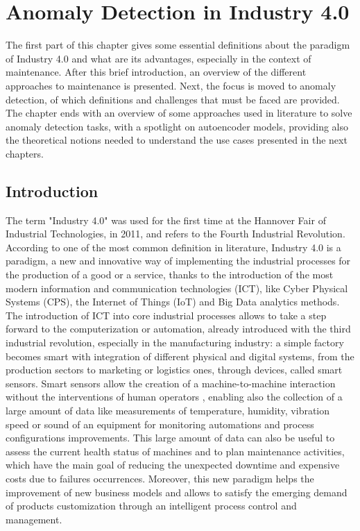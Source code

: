 \chapter{Anomaly Detection in Industry 4.0}


The first part of this chapter gives some essential definitions about the paradigm of Industry 4.0 and what are its advantages, especially in the context of maintenance. After this brief introduction, an overview of the different approaches to maintenance is presented. Next, the focus is moved to anomaly detection, of which definitions and challenges that must be faced are provided. The chapter ends with an overview of some approaches used in literature to solve anomaly detection tasks, with a spotlight on autoencoder models, providing also the theoretical notions needed to understand the use cases presented in the next chapters.

\section{Introduction}
The term "Industry 4.0" was used for the first time at the Hannover Fair of Industrial Technologies, in 2011, and refers to the Fourth Industrial Revolution. According to one of the most common definition in literature, Industry 4.0 is a paradigm, a new and innovative way of implementing the industrial processes for the production of a good or a service, thanks to the introduction of the most modern information and communication technologies (ICT), like Cyber Physical Systems (CPS), the Internet of Things (IoT) and Big Data analytics methods.\\ 
The introduction of ICT into core industrial processes allows to take a step forward to the computerization or automation, already introduced with the third industrial revolution, especially in the manufacturing industry: a simple factory becomes smart with integration of different physical and digital systems, from the production sectors to marketing or logistics ones, through devices, called smart sensors. Smart sensors allow the creation of a machine-to-machine interaction without the interventions of human operators \cite{1smartfactory}, enabling also the collection of a large amount of data like measurements of temperature, humidity, vibration speed or sound of an equipment for monitoring automations and process configurations improvements. This large amount of data can also be useful to assess the current health status of machines and to plan maintenance activities, which have the main goal of reducing the unexpected downtime and expensive costs due to failures occurrences. Moreover, this new paradigm helps the improvement of new business models and allows to satisfy the emerging demand of products customization through an intelligent process control and management.

